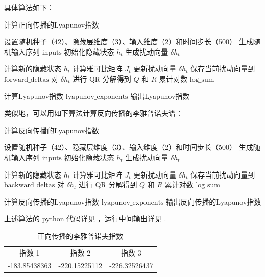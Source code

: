 具体算法如下：

\begin{algorithm}
   \caption{计算正向传播的Lyapunov指数}
   \begin{algorithmic}[1]
      \STATE 设置随机种子（42）、隐藏层维度（3）、输入维度（2）和时间步长（500）
      \STATE 生成随机输入序列 $\text{inputs}$
      \STATE 初始化隐藏状态 $h_t$
      \STATE 生成扰动向量 $\delta h_t$

            \STATE 计算新的隐藏状态 $h_t$
            \STATE 计算雅可比矩阵 $J_t$
            \STATE 更新扰动向量 $\delta h_t$
            \STATE 保存当前扰动向量到 $\text{forward\_deltas}$
            \STATE 对 $\delta h_t$ 进行 QR 分解得到 $Q$ 和 $R$
            \STATE 累计对数 $\text{log\_sum}$
      \ENDFOR

      \STATE 计算Lyapunov指数 $\text{lyapunov\_exponents}$
      \STATE 输出Lyapunov指数
   \end{algorithmic}
\end{algorithm}

类似地，可以用如下算法计算反向传播的李雅普诺夫谱：

\begin{algorithm}
   \caption{计算反向传播的Lyapunov指数}
   \begin{algorithmic}[1]
      \STATE 设置随机种子（42）、隐藏层维度（3）、输入维度（2）和时间步长（500）
      \STATE 生成随机输入序列 $\text{inputs}$
      \STATE 初始化隐藏状态 $h_t$
      \STATE 生成扰动向量 $\delta h_t$

            \STATE 计算新的隐藏状态 $h_t$
            \STATE 计算雅可比矩阵 $J_t$
            \STATE 更新扰动向量 $\delta h_t$
            \STATE 保存当前扰动向量到 $\text{backward\_deltas}$
            \STATE 对 $\delta h_t$ 进行 QR 分解得到 $Q$ 和 $R$
            \STATE 累计对数 $\text{log\_sum}$
      \ENDFOR

      \STATE 计算反向传播的Lyapunov指数 $\text{lyapunov\_exponents}$
      \STATE 输出反向传播的Lyapunov指数
   \end{algorithmic}
\end{algorithm}

上述算法的 python 代码详见 \cite{sec:code}，运行中间输出详见 \cite{sec:result}. 

\begin{table}[htbp]
   \caption{正向传播的李雅普诺夫指数}
   \begin{tabular}{ccc}
      指数 1 & 指数 2 & 指数 3 \\
      -183.85438363 & -220.15225112 & -226.32526437
   \end{tabular}
\end{table}

